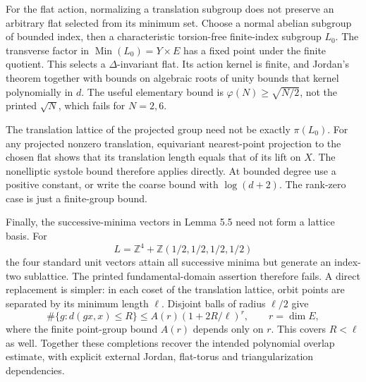 \documentclass[10pt]{article}
\begin{document}
For the flat action, normalizing a translation subgroup does not preserve an arbitrary flat selected from its minimum set. Choose a normal abelian subgroup of bounded index, then a characteristic torsion-free finite-index subgroup \(L_0\). The transverse factor in \(\operatorname{Min}(L_0)=Y\times E\) has a fixed point under the finite quotient. This selects a \(\Delta\)-invariant flat. Its action kernel is finite, and Jordan’s theorem together with bounds on algebraic roots of unity bounds that kernel polynomially in \(d\). The useful elementary bound is \(\varphi(N)\ge\sqrt{N/2}\), not the printed \(\sqrt N\), which fails for \(N=2,6\).\par
The translation lattice of the projected group need not be exactly \(\pi(L_0)\). For any projected nonzero translation, equivariant nearest-point projection to the chosen flat shows that its translation length equals that of its lift on \(X\). The nonelliptic systole bound therefore applies directly. At bounded degree use a positive constant, or write the coarse bound with \(\log(d+2)\). The rank-zero case is just a finite-group bound.\par
Finally, the successive-minima vectors in Lemma 5.5 need not form a lattice basis. For \[L=\mathbb Z^4+\mathbb Z(1/2,1/2,1/2,1/2)\] the four standard unit vectors attain all successive minima but generate an index-two sublattice. The printed fundamental-domain assertion therefore fails. A direct replacement is simpler: in each coset of the translation lattice, orbit points are separated by its minimum length \(\ell\). Disjoint balls of radius \(\ell/2\) give \[\#\{g:d(gx,x)\le R\}\le A(r)(1+2R/\ell)^r,
 \qquad r=\dim E,
 \tag{5.1}\] where the finite point-group bound \(A(r)\) depends only on \(r\). This covers \(R<\ell\) as well. Together these completions recover the intended polynomial overlap estimate, with explicit external Jordan, flat-torus and triangularization dependencies.\par
\end{document}
